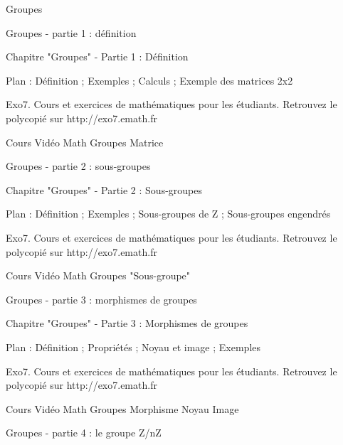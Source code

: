 
   Groupes

Groupes - partie 1 : définition



Chapitre "Groupes" - Partie 1 : Définition

Plan : Définition ; Exemples ; Calculs ;
Exemple des matrices 2x2

Exo7. Cours et exercices de mathématiques pour les étudiants.
Retrouvez le polycopié sur http://exo7.emath.fr


Cours Vidéo Math Groupes Matrice



Groupes - partie 2 : sous-groupes



Chapitre "Groupes" - Partie 2 : Sous-groupes

Plan : Définition ; Exemples ; Sous-groupes de Z ;
Sous-groupes engendrés

Exo7. Cours et exercices de mathématiques pour les étudiants.
Retrouvez le polycopié sur http://exo7.emath.fr


Cours Vidéo Math Groupes "Sous-groupe"



Groupes - partie 3 : morphismes de groupes



Chapitre "Groupes" - Partie 3 : Morphismes de groupes

Plan : Définition ; Propriétés ; Noyau et image ; Exemples

Exo7. Cours et exercices de mathématiques pour les étudiants.
Retrouvez le polycopié sur http://exo7.emath.fr


Cours Vidéo Math Groupes Morphisme Noyau Image



Groupes - partie 4 : le groupe Z/nZ



